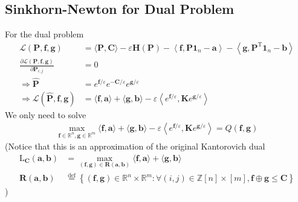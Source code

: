\documentclass{article}
\begin{document}
\begin{large}
\subsection{Sinkhorn-Newton for Dual Problem}
For the dual problem
\begin{align}
\mathcal { L } ( \mathbf { P } , \mathbf { f } , \mathbf { g } ) &= \langle \mathbf { P } , \mathbf { C } \rangle - \varepsilon \mathbf { H } ( \mathbf { P } ) - \left\langle \mathbf { f } , \mathbf { P } \mathbf { 1 } _ { n } - \mathbf { a } \right\rangle - \left\langle \mathbf { g } , \mathbf { P } ^ { \mathrm { T } } \mathbf{ 1 } _ { n } - \mathbf { b } \right\rangle\\
\frac { \partial \mathcal { L } ( \mathbf { P } , \mathbf { f } , \mathbf { g } ) } { \partial \mathbf { P } _ { i , j } } &=0\\
\Rightarrow\hat{\mathbf { P }} &= e ^ { \mathbf { f }  / \varepsilon } e ^ { - \mathbf { C } / \varepsilon } e ^ { \mathbf { g }/ \varepsilon }\\
\Rightarrow \mathcal{L}( \hat{\mathbf { P }} , \mathbf { f } , \mathbf { g } ) &= \langle \mathbf { f } , \mathbf { a } \rangle + \langle \mathbf { g } , \mathbf { b } \rangle - \varepsilon \left\langle e ^ { \mathbf { f } / \varepsilon } , \mathbf { K } e ^ { \mathbf { g } / \varepsilon } \right\rangle
\end{align}
We only need to solve
\begin{align}
\max _ { \mathbf { f } \in \mathbb { R } ^ { n } , \mathbf { g } \in \mathbb { R } ^ { m } } \langle \mathbf { f } , \mathbf { a } \rangle + \langle \mathbf { g } , \mathbf { b } \rangle - \varepsilon \left\langle e ^ { \mathbf { f } / \varepsilon } , \mathbf { K } e ^ { \mathbf { g } / \varepsilon } \right\rangle = Q ( \mathbf { f } , \mathbf { g } )
\end{align}
(Notice that this is an approximation of the original Kantorovich dual
\begin{align}
\mathrm { L } _ { \mathbf { C } } ( \mathbf { a } , \mathbf { b } ) &= \max _ { ( \mathbf { f } , \mathbf { g } ) \in \mathbf { R } ( \mathbf { a } , \mathbf { b } ) } \langle \mathbf { f } , \mathbf { a } \rangle + \langle \mathbf { g } , \mathbf { b } \rangle\\
\mathbf { R } ( \mathbf { a } , \mathbf { b } ) &\stackrel { \mathrm { def } } { = } \left\{ ( \mathbf { f } , \mathbf { g } ) \in \mathbb { R } ^ { n } \times \mathbb { R } ^ { m } : \forall ( i , j ) \in \mathbb { Z } [ n ] \times [ m ] , \mathbf { f } \oplus \mathbf { g } \leq \mathbf { C } \right\}
\end{align}
)


\end{large}
\end{document}
